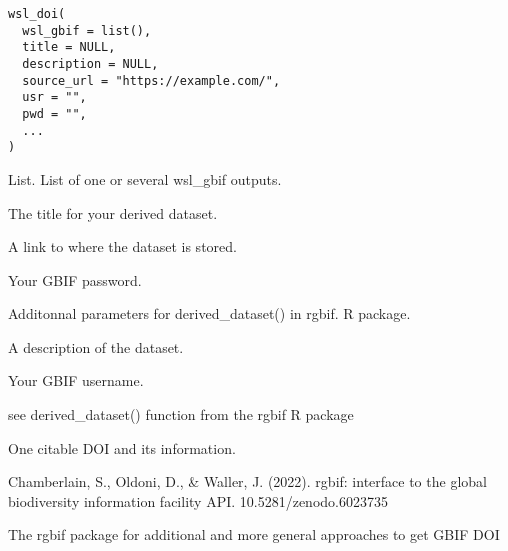 \documentclass[a4paper]{book}
\begin{document}
%
\begin{Usage}
\begin{verbatim}
wsl_doi(
  wsl_gbif = list(),
  title = NULL,
  description = NULL,
  source_url = "https://example.com/",
  usr = "",
  pwd = "",
  ...
)
\end{verbatim}
\end{Usage}
%
\begin{Arguments}
\begin{ldescription}
\item[\code{wsl\_gbif}] List. List of one or several wsl\_gbif outputs.

\item[\code{title}] The title for your derived dataset.

\item[\code{source\_url}] A link to where the dataset is stored.

\item[\code{pwd}] Your GBIF password.

\item[\code{...}] Additonnal parameters for derived\_dataset() in rgbif.
R package.

\item[\code{descritpion}] A description of the dataset.

\item[\code{user}] Your GBIF username.
\end{ldescription}
\end{Arguments}
%
\begin{Details}\relax
see derived\_dataset() function from the rgbif R package
\end{Details}
%
\begin{Value}
One citable DOI and its information.
\end{Value}
%
\begin{References}\relax
Chamberlain, S., Oldoni, D., \& Waller, J. (2022). rgbif: interface to the global biodiversity
information facility API. 10.5281/zenodo.6023735
\end{References}
%
\begin{SeeAlso}\relax
The rgbif package for additional and more general approaches to get GBIF DOI
\end{SeeAlso}
%
\begin{Examples}
\end{Examples}
\end{document}
